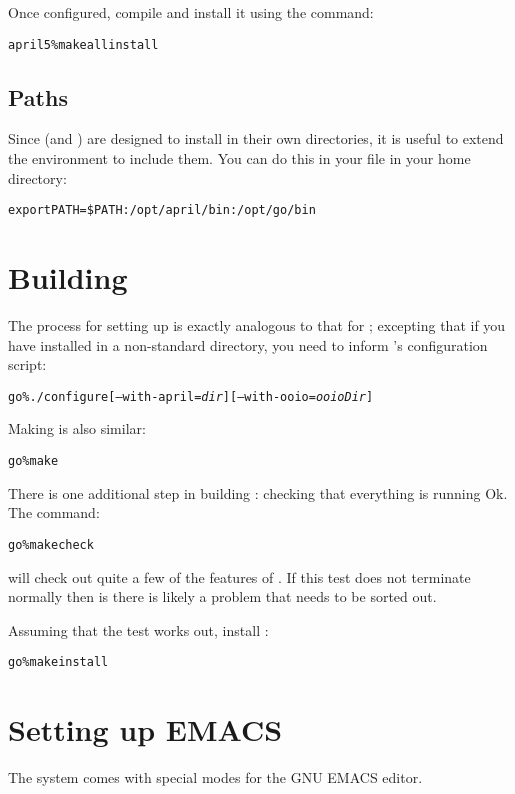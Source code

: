 Once configured, compile \april and install it using the  command:
\begin{alltt}
april5 \% make all install
\end{alltt}

\subsection{Paths}
Since \april (and \go) are designed to install in their own directories, it is useful to extend the  environment to include them. You can do this in your  file in your home directory:
\begin{alltt}
export PATH=\$PATH:/opt/april/bin:/opt/go/bin
\end{alltt}

\section{Building \go}
The process for setting up \go is exactly analogous to that for \april; excepting that if you have installed \april in a non-standard directory, you need to inform \go's configuration script:
\begin{alltt}
go \% ./configure[--with-april=\emph{dir}] [--with-ooio=\emph{ooioDir}]
\end{alltt}

Making \go is also similar:
\begin{alltt}
go \% make
\end{alltt}
There is one additional step in building \go: checking that everything is running Ok. The command:
\begin{alltt}
go \% make check
\end{alltt}
will check out quite a few of the features of \go. If this test does not terminate normally then is there is likely a problem that needs to be sorted out.

Assuming that the test works out, install \go:
\begin{alltt}
go \% make install
\end{alltt}

\section{Setting up EMACS}
The \go system comes with special modes for the GNU EMACS editor.

